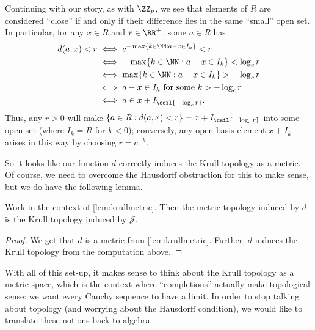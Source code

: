 Continuing with our story, as with $\ZZ_p$, we see that elements of $R$ are considered ``close'' if and only if their difference lies in the same ``small'' open set. In particular, for any $x\in R$ and $r\in\RR^+$, some $a\in R$ has
\begin{align*}
	d(a,x)<r &\iff c^{-\max\{k\in\NN:a-x\in I_k\}}<r \\
	&\iff -\max\{k\in\NN:a-x\in I_k\}<\log_cr \\
	&\iff \max\{k\in\NN:a-x\in I_k\}>-\log_cr \\
	&\iff a-x\in I_k\text{ for some }k>-\log_cr \\
	&\iff a\in x+I_{\ceil{-\log_cr}}.
\end{align*}
Thus, any $r>0$ will make $\{a\in R:d(a,x)<r\}=x+I_{\ceil{-\log_cr}}$ into some open set (where $I_k=R$ for $k<0$); conversely, any open basis element $x+I_k$ arises in this way by choosing $r=c^{-k}$.

So it looks like our function $d$ correctly induces the Krull topology as a metric. Of course, we need to overcome the Hausdorff obstruction for this to make sense, but we do have the following lemma.
\begin{lemma}
	Work in the context of \autoref{lem:krullmetric}. Then the metric topology induced by $d$ is the Krull topology induced by $\mathcal J$.
\end{lemma}
\begin{proof}
	We get that $d$ is a metric from \autoref{lem:krullmetric}. Further, $d$ induces the Krull topology from the computation above.
\end{proof}
With all of this set-up, it makes sense to think about the Krull topology as a metric space, which is the context where ``completions'' actually make topological sense: we want every Cauchy sequence to have a limit. In order to stop talking about topology (and worrying about the Hausdorff condition), we would like to translate these notions back to algebra.

